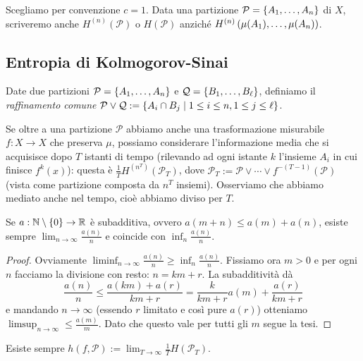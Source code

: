 Scegliamo per convenzione $c=1$.
Data una partizione $\mathcal{P}=\left\{A_1,\dots,A_n\right\}$ di $X$, scriveremo anche $H^{(n)}(\mathcal{P})$ o $H(\mathcal{P})$
anziché $H^{(n)}\left(\mu(A_1),\dots,\mu(A_n)\right)$.

\subsection{Entropia di Kolmogorov-Sinai}

\begin{defi}Date due partizioni $\mathcal{P}=\left\{A_1,\dots,A_n\right\}$ e $\mathcal{Q}=\left\{B_1,\dots,B_\ell\right\}$,
definiamo il \emph{raffinamento comune} $\mathcal{P}\vee\mathcal{Q}:=\left\{A_i\cap B_j\mid 1\le i\le n,1\le j\le \ell\right\}$.
\end{defi}

Se oltre a una partizione $\mathcal{P}$ abbiamo anche una trasformazione misurabile $f:X\to X$ che preserva $\mu$,
possiamo considerare l'informazione media che si acquisisce dopo $T$ istanti di tempo (rilevando
ad ogni istante $k$ l'insieme $A_i$ in cui finisce $f^k(x)$): questa è $\frac{1}{T}H^{(n^T)}(\mathcal{P}_T)$,
dove $\mathcal{P}_T:=\mathcal{P}\vee\cdots\vee f^{-(T-1)}(\mathcal{P})$ (vista come partizione composta
da $n^T$ insiemi). Osserviamo che abbiamo mediato anche nel tempo, cioè abbiamo diviso per $T$.

\begin{lemma}\label{fekete} Se $a:\mathbb{N}\setminus\left\{0\right\}\to\mathbb{R}$ è subadditiva, ovvero $a(m+n)\le a(m)+a(n)$, esiste sempre
$\lim_{n\to\infty}\frac{a(n)}{n}$ e coincide con $\inf_n\frac{a(n)}{n}$.
\end{lemma}

\begin{proof}Ovviamente $\liminf_{n\to\infty}\frac{a(n)}{n}\ge\inf_n\frac{a(n)}{n}$. Fissiamo ora $m>0$
e per ogni $n$ facciamo la divisione con resto: $n=km+r$. La subadditività dà
\[ \frac{a(n)}{n}\le\frac{a(km)+a(r)}{km+r}=\frac{k}{km+r}a(m)+\frac{a(r)}{km+r} \]
e mandando $n\to\infty$ (essendo $r$ limitato e così pure $a(r)$) otteniamo $\limsup_{n\to\infty}\le\frac{a(m)}{m}$.
Dato che questo vale per tutti gli $m$ segue la tesi.
\end{proof}

\begin{cor}Esiste sempre $h(f,\mathcal{P}):=\lim_{T\to\infty}\frac{1}{T}H(\mathcal{P}_T)$.
\end{cor}

